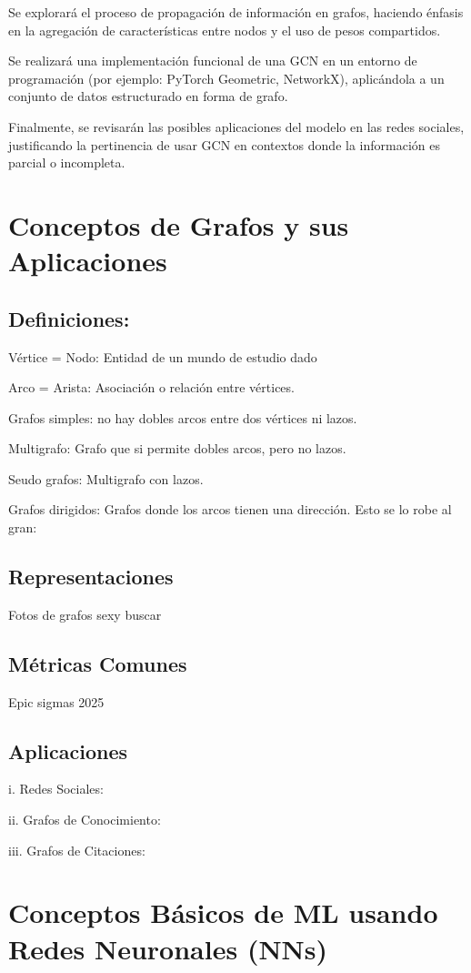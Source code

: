 \documentclass[11pt]{article} %
\begin{document}
    Se explorará el proceso de propagación de información en grafos, haciendo énfasis en la agregación de características entre nodos y el uso de pesos compartidos. 

    Se realizará una implementación funcional de una GCN en un entorno de programación (por ejemplo: PyTorch Geometric, NetworkX), aplicándola a un conjunto de datos estructurado en forma de grafo. 

    Finalmente, se revisarán las posibles aplicaciones del modelo en las redes sociales, justificando la pertinencia de usar GCN en contextos donde la información es parcial o incompleta. 
\newpage
{\section{Conceptos de Grafos y sus Aplicaciones}}
\subsection{Definiciones:}
Vértice = Nodo: Entidad de un mundo de estudio dado 

Arco = Arista: Asociación o relación entre vértices.

Grafos simples: no hay dobles arcos entre dos vértices ni lazos.

Multigrafo: Grafo que si permite dobles arcos, pero no lazos.

Seudo grafos: Multigrafo con lazos.

Grafos dirigidos: Grafos donde los arcos tienen una dirección.
Esto se lo robe al gran:~\cite{carlosloria}
\vspace{5pt}
    
\subsection{Representaciones }
Fotos de grafos sexy buscar
\subsection{Métricas Comunes }
Epic sigmas 2025
\subsection{Aplicaciones }
i. Redes Sociales: 

ii. Grafos de Conocimiento: 

iii. Grafos de Citaciones: 
\newpage
{\section{Conceptos Básicos de ML usando Redes Neuronales (NNs)}} \vspace{10pt}
\end{document}
